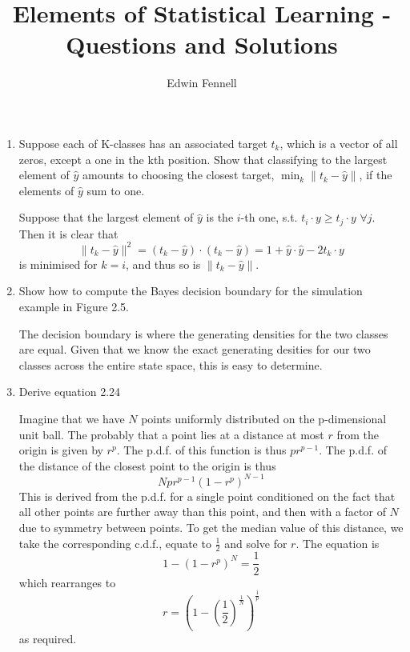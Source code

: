 \documentclass{article}
\title{Elements of Statistical Learning - Questions and Solutions}
\author{Edwin Fennell}
\date{}
\newcommand{\chapternumber}{1}
\newenvironment{QandA}{\begin{enumerate}[label=\chapternumber.\arabic*]\bfseries\boldmath}
	{\end{enumerate}}
\newenvironment{answered}{\par\bigskip\normalfont\unboldmath}{}
\begin{document}
	\maketitle
	
	\noindent%
	\begin{QandA}
		\item Suppose each of K-classes has an associated target $t_k$, which is a
		vector of all zeros, except a one in the kth position. Show that classifying to
		the largest element of $\hat{y}$ amounts to choosing the closest target,  $\min_{k}\|t_k-\hat{y}\|$, if the elements of $\hat{y}$ sum to one.
		\begin{answered}
			Suppose that the largest element of $\hat{y}$ is the $i$-th one, s.t. $t_i\cdot y\geq t_j\cdot y$ $\forall j$. Then it is clear that
			\[\|t_k-\hat{y}\|^2=(t_k-\hat{y})\cdot(t_k-\hat{y})=1+\hat{y}\cdot\hat{y}-2t_k\cdot y\]
			is minimised for $k=i$, and thus so is $\|t_k-\hat{y}\|$. 
		\end{answered}
	
	\item Show how to compute the Bayes decision boundary for the simulation example in Figure 2.5.
	\begin{answered}
		The decision boundary is where the generating densities for the two classes are equal. Given that we know the exact generating desities for our two classes across the entire state space, this is easy to determine.
	\end{answered}

	\item Derive equation 2.24
	\begin{answered}
		Imagine that we have $N$ points uniformly distributed on the p-dimensional unit ball. The probably that a point lies at a distance at most $r$ from the origin is given by $r^p$. The p.d.f. of this function is thus $pr^{p-1}$. The p.d.f. of the distance of the closest point to the origin is thus
		\[Npr^{p-1}(1-r^p)^{N-1}\]
		This is derived from the p.d.f. for a single point conditioned on the fact that all other points are further away than this point, and then with a factor of $N$ due to symmetry between points.
		To get the median value of this distance, we take the corresponding c.d.f., equate to $\frac{1}{2}$ and solve for $r$. The equation is
		\[1-(1-r^p)^N=\frac{1}{2}\]
		which rearranges to
		\[r=\left(1-\left(\frac{1}{2}\right)^\frac{1}{N}\right)^\frac{1}{p}\]
		as required.
		
	\end{answered}


\end{QandA}
\end{document}
